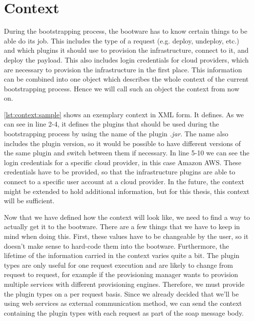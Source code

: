 \section{Context}
\label{context}

During the bootstrapping process, the bootware has to know certain things to be able do its job.
This includes the type of a request (e.g. deploy, undeploy, etc.) and which plugins it should use to provision the infrastructure, connect to it, and deploy the payload.
This also includes login credentials for cloud providers, which are necessary to provision the infrastructure in the first place.
This information can be combined into one object which describes the whole context of the current bootstrapping process.
Hence we will call such an object the context from now on.

\vspace*{\baselineskip}

\autoref{lst:context:sample} shows an exemplary context in XML form.
It defines.
As we can see in line 2-4, it defines the plugins that should be used during the bootstrapping process by using the name of the plugin \textit{.jar}.
The name also includes the plugin version, so it would be possible to have different versions of the same plugin and switch between them if necessary.
In line 5-10 we can see the login credentials for a specific cloud provider, in this case Amazon AWS.
These credentials have to be provided, so that the infrastructure plugins are able to connect to a specific user account at a cloud provider.
In the future, the context might be extended to hold additional information, but for this thesis, this context will be sufficient.

Now that we have defined how the context will look like, we need to find a way to actually get it to the bootware.
There are a few things that we have to keep in mind when doing this.
First, these values have to be changeable by the user, so it doesn't make sense to hard-code them into the bootware.
Furthermore, the lifetime of the information carried in the context varies quite a bit.
The plugin types are only useful for one request execution and are likely to change from request to request, for example if the provisioning manager wants to provision multiple services with different provisioning engines.
Therefore, we must provide the plugin types on a per request basis.
Since we already decided that we'll be using web services as external communication method, we can send the context containing the plugin types with each request as part of the soap message body.


